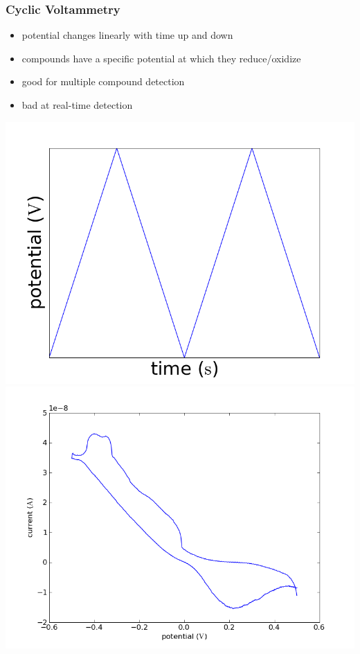 \documentclass[10pt]{beamer}
\begin{document}
\begin{frame}
	\frametitle{Cyclic Voltammetry}
	\begin{itemize}
		\item potential changes linearly with time up and down
		\item compounds have a specific potential at which they reduce/oxidize
		\item good for multiple compound detection
		\item bad at real-time detection
	\end{itemize}
	\includegraphics[width=0.5\linewidth]{figures/cv.png}
	\includegraphics[width=0.5\linewidth]{figures/63.png}
\end{frame}
\end{document}

